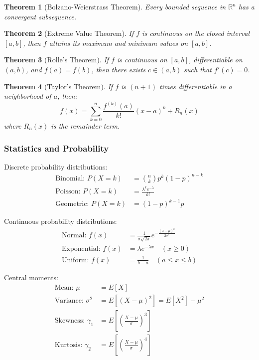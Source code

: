 \documentclass[12pt]{article}
\newtheorem{theorem}{Theorem}
\begin{document}
\begin{theorem}[Bolzano-Weierstrass Theorem]
Every bounded sequence in $\mathbb{R}^n$ has a convergent subsequence.
\end{theorem}

\begin{theorem}[Extreme Value Theorem]
If $f$ is continuous on the closed interval $[a,b]$, then $f$ attains its maximum and minimum values on $[a,b]$.
\end{theorem}

\begin{theorem}[Rolle's Theorem]
If $f$ is continuous on $[a,b]$, differentiable on $(a,b)$, and $f(a) = f(b)$, then there exists $c \in (a,b)$ such that $f'(c) = 0$.
\end{theorem}

\begin{theorem}[Taylor's Theorem]
If $f$ is $(n+1)$ times differentiable in a neighborhood of $a$, then:
\begin{equation}
f(x) = \sum_{k=0}^{n} \frac{f^{(k)}(a)}{k!}(x-a)^k + R_n(x)
\end{equation}
where $R_n(x)$ is the remainder term.
\end{theorem}

\subsubsection{Statistics and Probability}

Discrete probability distributions:
\begin{align}
\text{Binomial: } P(X = k) &= \binom{n}{k} p^k (1-p)^{n-k} \\
\text{Poisson: } P(X = k) &= \frac{\lambda^k e^{-\lambda}}{k!} \\
\text{Geometric: } P(X = k) &= (1-p)^{k-1} p
\end{align}

Continuous probability distributions:
\begin{align}
\text{Normal: } f(x) &= \frac{1}{\sigma\sqrt{2\pi}} e^{-\frac{(x-\mu)^2}{2\sigma^2}} \\
\text{Exponential: } f(x) &= \lambda e^{-\lambda x} \quad (x \geq 0) \\
\text{Uniform: } f(x) &= \frac{1}{b-a} \quad (a \leq x \leq b)
\end{align}

Central moments:
\begin{align}
\text{Mean: } \mu &= E[X] \\
\text{Variance: } \sigma^2 &= E[(X-\mu)^2] = E[X^2] - \mu^2 \\
\text{Skewness: } \gamma_1 &= E\left[\left(\frac{X-\mu}{\sigma}\right)^3\right] \\
\text{Kurtosis: } \gamma_2 &= E\left[\left(\frac{X-\mu}{\sigma}\right)^4\right]
\end{align}
\end{document}
